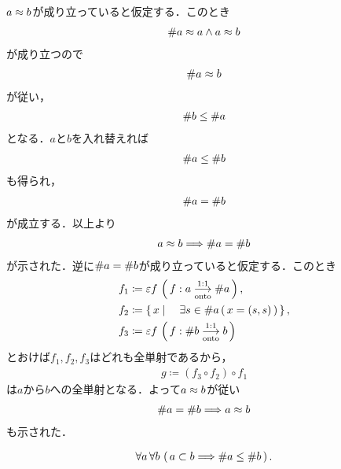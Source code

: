 	\begin{prf}
		$a \approx b$が成り立っていると仮定する．このとき
		\begin{align}
			\# a \approx a \wedge a \approx b
		\end{align}
		が成り立つので
		\begin{align}
			\# a \approx b
		\end{align}
		が従い，
		\begin{align}
			\# b \leq \# a
		\end{align}
		となる．$a$と$b$を入れ替えれば
		\begin{align}
			\# a \leq \# b
		\end{align}
		も得られ，
		\begin{align}
			\# a = \# b
		\end{align}
		が成立する．以上より
		\begin{align}
			a \approx b \Longrightarrow \# a = \# b
		\end{align}
		が示された．逆に$\# a = \# b$が成り立っていると仮定する．このとき
		\begin{align}
			f_1 &\coloneqq \varepsilon f\, \left(\, f:a \underset{\mathrm{onto}}{\overset{\mathrm{1:1}}{\longrightarrow}} \# a\, \right), \\
			f_2 &\coloneqq \left\{\, x \mid \quad \exists s \in \# a\, (\,x = (s,s)\, )\, \right\}, \\
			f_3 &\coloneqq \varepsilon f\, \left(\, f:\# b \underset{\mathrm{onto}}{\overset{\mathrm{1:1}}{\longrightarrow}} b\, \right)
		\end{align}
		とおけば$f_1,f_2,f_3$はどれも全単射であるから，
		\begin{align}
			g \coloneqq (f_3 \circ f_2) \circ f_1
		\end{align}
		は$a$から$b$への全単射となる．よって$a \approx b$が従い
		\begin{align}
			\# a = \# b \Longrightarrow a \approx b
		\end{align}
		も示された．
		\QED
	\end{prf}
	
	\begin{screen}
		\begin{thm}[集合が大きい方が濃度も大きい]
			\begin{align}
				\forall a\, \forall b\, \left(\, a \subset b \Longrightarrow \# a \leq \# b\, \right).
			\end{align}
		\end{thm}
	\end{screen}
	
